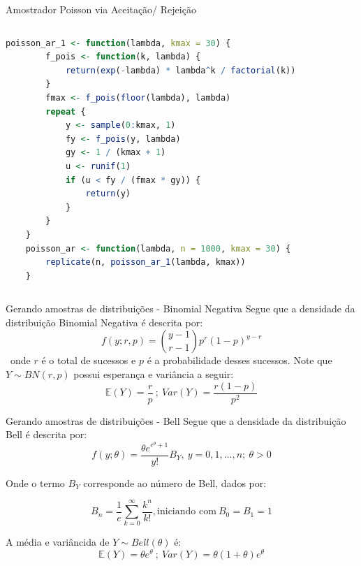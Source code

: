 \documentclass{beamer} %
\begin{document}
\begin{frame}[fragile]{Amostrador Poisson via Aceitação/ Rejeição}
	\begin{columns}
		
		\begin{column}{0.85\textwidth}
			\begin{lstlisting}[language=R]
	poisson_ar_1 <- function(lambda, kmax = 30) {
		f_pois <- function(k, lambda) {
			return(exp(-lambda) * lambda^k / factorial(k))
		}	
		fmax <- f_pois(floor(lambda), lambda) 
		repeat {	
			y <- sample(0:kmax, 1)
			fy <- f_pois(y, lambda)		
			gy <- 1 / (kmax + 1)				
			u <- runif(1)
			if (u < fy / (fmax * gy)) {
				return(y)
			}
		}
	}
	poisson_ar <- function(lambda, n = 1000, kmax = 30) {
		replicate(n, poisson_ar_1(lambda, kmax))
	}
			\end{lstlisting}
		\end{column}
		
		\begin{column}{0.15\textwidth}
		\href{https://github.com/andresavassi/Trabalho-1---MCCD-II/blob/main/poisson_ar.R}{}
		
		\vspace{0.5cm}
		
		\end{column}
	
	\end{columns}
\end{frame}




	\begin{frame}{Gerando amostras de distribuições - Binomial Negativa}
		Segue que a densidade da distribuição Binomial Negativa é descrita por:
		$$f(y; r,p) = \binom{y-1}{r-1} p^r(1-p)^{y-r}$$
		\ onde $r$ é o total de sucessos e $p$ é a probabilidade desses sucessos.
		Note que $Y \sim BN(r,p)$ possui esperança e variância a seguir:
		$$
		\mathbb{E}(Y) = \frac{r}{p}\ ;\ Var(Y) = \frac{r(1-p)}{p^2}
		$$
		
		
	\end{frame}


	\begin{frame}{Gerando amostras de distribuições - Bell}
		Segue que a densidade da distribuição Bell é descrita por:
		$$
		f(y; \theta) = \frac{\theta e^{e^{\theta} + 1}}{y!} B_Y,\ y = 0, 1, \dots, n; \ \theta > 0
		$$
		
		Onde o termo $B_Y$ corresponde ao número de Bell, dados por:
		
		$$
		B_n= \frac{1}{e} \sum_{k = 0}^{\infty} \frac{k^n}{k!}, \text{iniciando com}\ B_0 = B_1 = 1
		$$
		
		A média e variâncida de $Y \sim Bell(\theta)$ é:
		$$
		\mathbb{E}(Y) = \theta e^{\theta}\ ;\ 
		Var(Y) = \theta(1+\theta)e^{\theta}
		$$
		
	\end{frame}
	
\end{document}
